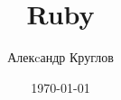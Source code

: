 \documentclass[a4paper, 12pt, oneside, openany, book]{ncc}
\begin{document}
\author{Алекcандр Круглов}
\title{Ruby}
\date{\today}
\maketitle

% 

% 
% 
% 
% 

% 
% 
% 
% 
% 
% 
% 

% 
% 
% 
% 
% 
% 
% 



% 
% 
% 
% 
% 

% 
\end{document}
